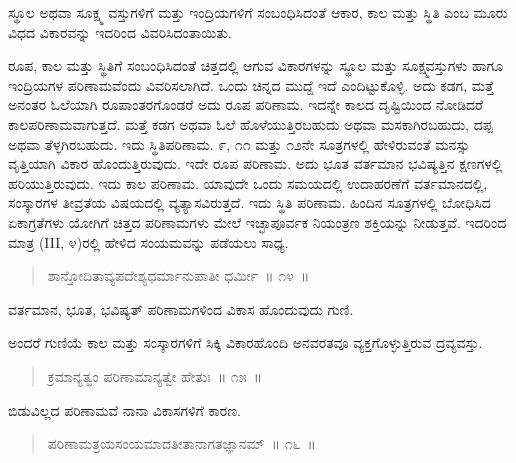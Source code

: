 \vspace{-0.3cm}

ಸ್ಥೂಲ ಅಥವಾ ಸೂಕ್ಷ್ಮ ವಸ್ತುಗಳಿಗೆ ಮತ್ತು ಇಂದ್ರಿಯಗಳಿಗೆ ಸಂಬಂಧಿಸಿದಂತೆ ಆಕಾರ, ಕಾಲ ಮತ್ತು ಸ್ಥಿತಿ ಎಂಬ ಮೂರು ವಿಧದ ವಿಕಾರವನ್ನು ಇದರಿಂದ ವಿವರಿಸಿದಂತಾಯಿತು. 

ರೂಪ, ಕಾಲ ಮತ್ತು ಸ್ಥಿತಿಗೆ ಸಂಬಂಧಿಸಿದಂತೆ ಚಿತ್ತದಲ್ಲಿ ಆಗುವ ವಿಕಾರಗಳನ್ನು ಸ್ಥೂಲ ಮತ್ತು ಸೂಕ್ಷ್ಮವಸ್ತುಗಳು ಹಾಗೂ ಇಂದ್ರಿಯಗಳ ಪರಿಣಾಮವೆಂದು ವಿವರಿಸಲಾಗಿದೆ. ಒಂದು ಚಿನ್ನದ ಮುದ್ದೆ ಇದೆ ಎಂದಿಟ್ಟುಕೊಳ್ಳಿ. ಅದು ಕಡಗ, ಮತ್ತೆ ಅನಂತರ ಓಲೆಯಾಗಿ ರೂಪಾಂತರಗೊಂಡರೆ ಅದು ರೂಪ ಪರಿಣಾಮ. ಇದನ್ನೇ ಕಾಲದ ದೃಷ್ಟಿಯಿಂದ ನೋಡಿದರೆ ಕಾಲಪರಿಣಾಮವಾಗುತ್ತದೆ. ಮತ್ತೆ ಕಡಗ ಅಥವಾ ಓಲೆ ಹೊಳೆಯುತ್ತಿರಬಹುದು ಅಥವಾ ಮಸಕಾಗಿರಬಹುದು, ದಪ್ಪ ಅಥವಾ ತೆಳ್ಳಗಿರಬಹುದು. ಇದು ಸ್ಥಿತಿಪರಿಣಾಮ. ೯, ೧೧ ಮತ್ತು ೧೨ನೇ ಸೂತ್ರಗಳಲ್ಲಿ ಹೇಳಿರುವಂತೆ ಮನಸ್ಸು ವೃತ್ತಿಯಾಗಿ ವಿಕಾರ ಹೊಂದುತ್ತಿರುವುದು. ಇದೇ ರೂಪ ಪರಿಣಾಮ. ಅದು ಭೂತ ವರ್ತಮಾನ ಭವಿಷ್ಯತ್ತಿನ ಕ್ಷಣಗಳಲ್ಲಿ ಹರಿಯುತ್ತಿರುವುದು. ಇದು ಕಾಲ ಪರಿಣಾಮ. ಯಾವುದೇ ಒಂದು ಸಮಯದಲ್ಲಿ ಉದಾಹರಣೆಗೆ ವರ್ತಮಾನದಲ್ಲಿ, ಸಂಸ್ಕಾರಗಳ ತೀವ್ರತೆಯ ವಿಷಯದಲ್ಲಿ ವ್ಯತ್ಯಾಸವಿರುತ್ತದೆ. ಇದು ಸ್ಥಿತಿ ಪರಿಣಾಮ. ಹಿಂದಿನ ಸೂತ್ರಗಳಲ್ಲಿ ಬೋಧಿಸಿದ ಏಕಾಗ್ರತೆಗಳು ಯೋಗಿಗೆ ಚಿತ್ತದ ಪರಿಣಾಮಗಳು ಮೇಲೆ ಇಚ್ಛಾಪೂರ್ವಕ ನಿಯಂತ್ರಣ ಶಕ್ತಿಯನ್ನು ನೀಡುತ್ತವೆ. ಇದರಿಂದ ಮಾತ್ರ (III, ೪)ರಲ್ಲಿ ಹೇಳಿದ ಸಂಯಮವನ್ನು ಪಡೆಯಲು ಸಾಧ್ಯ. 

\vspace{-0.3cm}

\begin{verse}
ಶಾನ್ತೋದಿತಾವ್ಯಪದೇಶ್ಯಧರ್ಮಾನುಪಾತೀ ಧರ್ಮೀ~॥ ೧೪~॥
\end{verse}

\vspace{-0.3cm}

ವರ್ತಮಾನ, ಭೂತ, ಭವಿಷ್ಯತ್​ ಪರಿಣಾಮಗಳಿಂದ ವಿಕಾಸ ಹೊಂದುವುದು ಗುಣಿ. 

ಅಂದರೆ ಗುಣಿಯೆ ಕಾಲ ಮತ್ತು ಸಂಸ್ಕಾರಗಳಿಗೆ ಸಿಕ್ಕಿ ವಿಕಾರಹೊಂದಿ ಅನವರತವೂ ವ್ಯಕ್ತಗೊಳ್ಳುತ್ತಿರುವ ದ್ರವ್ಯವಸ್ತು. 

\vspace{-0.3cm}

\begin{verse}
ಕ್ರಮಾನ್ಯತ್ವಂ ಪರಿಣಾಮಾನ್ಯತ್ವೇ ಹೇತುಃ~॥ ೧೫~॥
\end{verse}

\vspace{-0.3cm}

ಬಿಡುವಿಲ್ಲದ ಪರಿಣಾಮವೆ ನಾನಾ ವಿಕಾಸಗಳಿಗೆ ಕಾರಣ. 

\vspace{-0.3cm}

\begin{verse}
ಪರಿಣಾಮತ್ರಯಸಂಯಮಾದತೀತಾನಾಗತಜ್ಞಾನಮ್​~॥ ೧೬~॥
\end{verse}

\vspace{-0.3cm}

